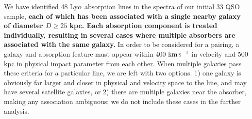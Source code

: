 \documentclass[twocolumn,tighten]{aastex6}
\begin{document}
We have identified 48 Ly$\alpha$ absorption lines in the spectra of our initial 33 QSO sample, \textbf{each of which has been associated with a single nearby galaxy of diameter $D\geq25$ kpc. Each absorption component is treated individually, resulting in several cases where multiple absorbers are associated with the same galaxy.} In order to be considered for a pairing, a galaxy and absorption feature must appear within 400 $\rm km\, s^{-1}$ in velocity and 500 kpc in physical impact parameter from each other. When multiple galaxies pass these criteria for a particular line, we are left with two options. 1) one galaxy is obviously far larger and closer in physical and velocity space to the line, and may have several satellite galaxies, or 2) there are multiple galaxies near the absorber, making any association ambiguous; we do not include these cases in the further analysis.
\end{document}
